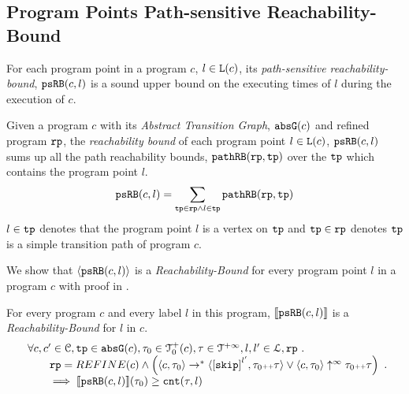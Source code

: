 \subsection{Program Points Path-sensitive Reachability-Bound}
\label{sec:point-psrb}
For each program point in a program $c$, $l \in \mathtt{L}(c)$,
its \emph{path-sensitive reachability-bound}, $\mathtt{psRB}(c, l)$ is a sound upper bound on the executing times of $l$ during the execution of $c$.
%
 \begin{defn}
  \label{def:point_psrb}
  Given a program $c$ with its \emph{Abstract Transition Graph}, $\mathtt{abs}{\mathtt{G}}(c)$ and refined program $\mathtt{rp}$,
  the \emph{reachability bound} of each program point $l \in \mathtt{L}(c)$, $\mathtt{psRB}(c, l)$ 
  sums up all the path reachability bounds, $\mathtt{pathRB}(\mathtt{rp}, \mathtt{tp})$ over the $\mathtt{tp}$ which contains the program point $l$.
  \[ 
    \mathtt{psRB}(c, l) = 
    \sum\limits_{\mathtt{tp} \in \mathtt{rp} \land 
  l \in \mathtt{tp}} 
  \mathtt{pathRB}(\mathtt{rp}, \mathtt{tp})
  \]
  $l \in \mathtt{tp}$ denotes that the program point $l$ is a vertex on $\mathtt{tp}$ 
  and $\mathtt{tp} \in \mathtt{rp}$ denotes $\mathtt{tp}$ is a simple transition path of program $c$.
 \end{defn}
We show that $\langle \mathtt{psRB}(c, l) \rangle$ is a \emph{Reachability-Bound} for every program point $l$ in a program $c$ with proof in .
\begin{thm}
    \label{thm:pathsensitive_rb_soundness}
  For every program ${c}$ and every label $l$ in this program,
  $\llbracket \mathtt{psRB}(c, l) \rrbracket$ is a \emph{Reachability-Bound} for $l$ in $c$.
  \[
    \begin{array}{l}
      \forall c, c' \in \cdom, \tpath \in \absG(c), \trace_0 \in \ftdom_0(c), \trace \in \tdom, l, l' \in \ldom, \rprog \st 
      \\ \qquad
      \rprog = REFINE(c) 
      \land
      \Big(
      \config{c, \trace_0} \rightarrow^* \config{\clabel{\eskip}^{l'}, \trace_0 \tracecat \trace}
      \lor \config{c, \trace_0} \uparrow^{\infty} \trace_0 \tracecat \trace 
      \Big)
      \\ \qquad
      \implies \econfig{\psRB(c, l)}(\trace_0) \geq \counter(\trace, l)
    \end{array}.
  \]
  \end{thm}
